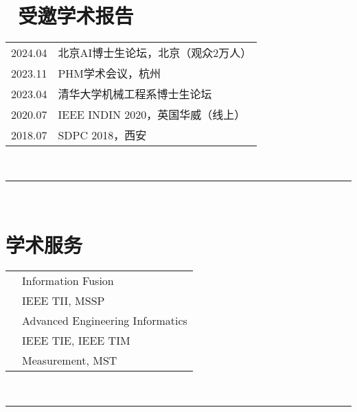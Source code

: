 \documentclass[oneside]{article}
\begin{document}
{\begin{minipage}[t][\dimexpr\textheight-2\fboxrule-2\fboxsep\relax][t]{\dimexpr0.4\textwidth-2\fboxrule-2\fboxsep\relax}
        \section*{\large 🎤 受邀学术报告}
        \begin{tabularx}{\textwidth}{cY}
            2024.04 & 北京AI博士生论坛，北京（观众2万人） \\
            2023.11 & PHM学术会议，杭州 \\
            2023.04 & 清华大学机械工程系博士生论坛 \\
            2020.07 & IEEE INDIN 2020，英国华威（线上） \\
            2018.07 & SDPC 2018，西安 \\
        \end{tabularx}
        \vspace{.3cm}
        \\
        \rule{\linewidth}{0.4pt}
        \\
        \section*{\large 学术服务}
        \begin{tabularx}{\textwidth}{cY}
            \faJournalWhills{} & Information Fusion \\
            \faJournalWhills{} & IEEE TII, MSSP \\
            \faJournalWhills{} & Advanced Engineering Informatics \\
            \faJournalWhills{} & IEEE TIE, IEEE TIM \\
            \faJournalWhills{} & Measurement, MST \\
        \end{tabularx}
        \vspace{.3cm}
        \\
        \rule{\linewidth}{0.4pt}
        \\

\end{minipage}}
\end{document}

